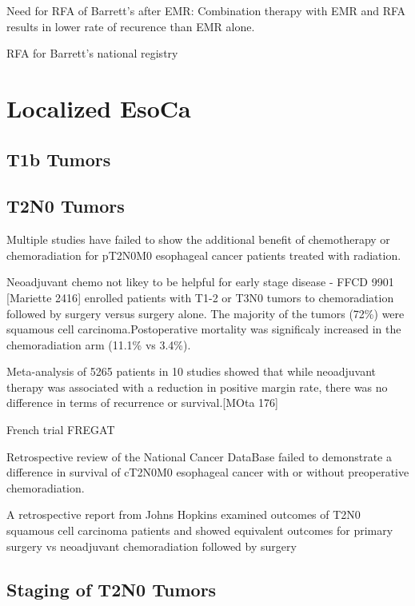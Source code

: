 \documentclass[
]{book}
\begin{document}
Need for RFA of Barrett's after EMR: \citep{haidry87} Combination therapy with EMR and RFA results in lower rate of recurence than EMR alone.\citep{pech1200}

RFA for Barrett's national registry \citep{ganz35}

\hypertarget{localized}{%
\chapter{Localized EsoCa}\label{localized}}

\hypertarget{t1b-tumors}{%
\section{T1b Tumors}\label{t1b-tumors}}

\hypertarget{t2n0-tumors}{%
\section{T2N0 Tumors}\label{t2n0-tumors}}

Multiple studies have failed to show the additional benefit of chemotherapy or chemoradiation for pT2N0M0 esophageal cancer patients treated with radiation.

Neoadjuvant chemo not likey to be helpful for early stage disease - FFCD 9901 {[}Mariette 2416{]} enrolled patients with T1-2 or T3N0 tumors to chemoradiation followed by surgery versus surgery alone. The majority of the tumors (72\%) were squamous cell carcinoma.Postoperative mortality was significaly increased in the chemoradiation arm (11.1\% vs 3.4\%).

Meta-analysis of 5265 patients in 10 studies showed that while neoadjuvant therapy was associated with a reduction in positive margin rate, there was no difference in terms of recurrence or survival.{[}MOta 176{]}

French trial FREGAT\citep{markar59}

Retrospective review of the National Cancer DataBase failed to demonstrate a difference in survival of cT2N0M0 esophageal cancer with or without preoperative chemoradiation.\citep{speicher1195}

A retrospective report from Johns Hopkins examined outcomes of T2N0 squamous cell carcinoma patients and showed equivalent outcomes for primary surgery vs neoadjuvant chemoradiation followed by surgery \citep{zhang429}

\hypertarget{staging-of-t2n0-tumors}{%
\section{Staging of T2N0 Tumors}\label{staging-of-t2n0-tumors}}
\end{document}
